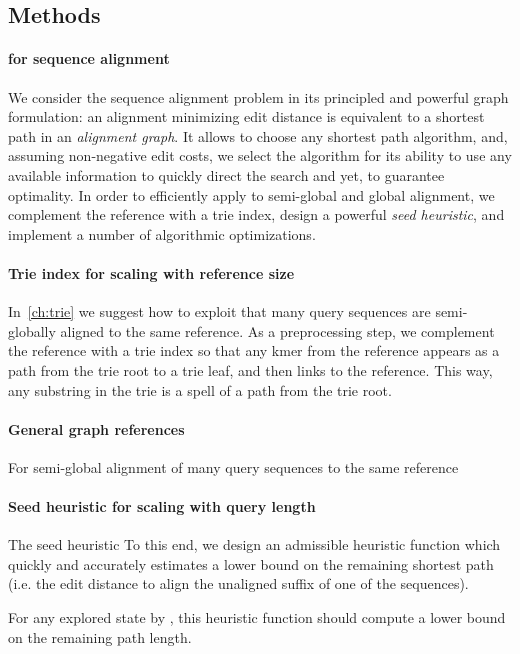 \subsection*{Methods}

\paragraph{\A for sequence alignment}
We consider the sequence alignment problem in its principled and powerful graph
formulation: an alignment minimizing edit distance is equivalent to a shortest
path in an \emph{alignment graph}. It allows to choose any shortest path
algorithm, and, assuming non-negative edit costs, we select the \A algorithm for
its ability to use any available information to quickly direct the search and
yet, to guarantee optimality. In order to efficiently apply \A to semi-global
and global alignment, we complement the reference with a trie index, design a
powerful \emph{seed heuristic}, and implement a number of algorithmic
optimizations.

\paragraph{Trie index for scaling with reference size}
In~\cref{ch:trie} we suggest how to exploit that many query sequences are
semi-globally aligned to the same reference. As a preprocessing step, we
complement the reference with a trie index so that any kmer from the reference
appears as a path from the trie root to a trie leaf, and then links to the
reference. This way, any substring in the trie is a spell of a path from the
trie root.

\paragraph{General graph references}
For semi-global alignment of many query sequences to the same reference

\paragraph{Seed heuristic for scaling with query length}
The seed heuristic To this end, we design an admissible heuristic function which
quickly and accurately estimates a lower bound on the remaining shortest path
(i.e. the edit distance to align the unaligned suffix of one of the sequences). 

For any explored state by \A, this heuristic function should compute a lower
bound on the remaining path length.

